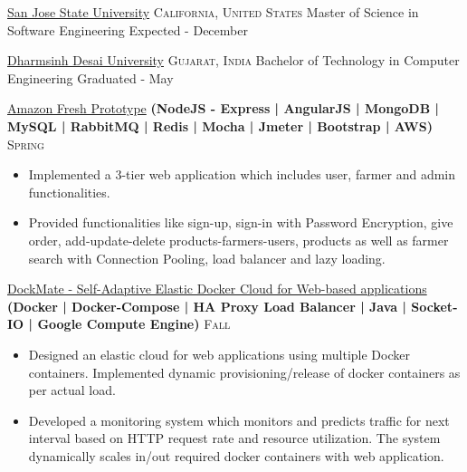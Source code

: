 \documentclass[10pt,a4paper]{article}
\begin{document}
{{\headedsection
  {\href{http://www.sjsu.edu/}{San Jose State University} }
  {\textsc{California, United States}} {%
  \headedsubsection
    {Master of Science in Software Engineering}
    {Expected - December }
    {}
}


\headedsection
  {\href{http://ddu.ac.in}{Dharmsinh Desai University} }
  {\textsc{Gujarat, India}} {%
  \headedsubsection
    {Bachelor of Technology in Computer Engineering}
    {Graduated - May }
    {}
}

\spacedhrule{0.0em}{-0.4em}




\headedsection  %
  {\href{https://github.com/darshilsaraiya/Amazon}{Amazon Fresh Prototype}
  \textbf{
  \small{(NodeJS - Express | AngularJS | MongoDB | MySQL | RabbitMQ | Redis | Mocha | Jmeter | Bootstrap | AWS)}}}
  {\textsc{Spring }} {%
  
    {\bodytext
    {
    \begin{itemize}
        \item Implemented a 3-tier web application which includes user, farmer and admin functionalities.
        \item Provided functionalities like sign-up, sign-in with Password Encryption, give order, add-update-delete products-farmers-users, products as well as farmer search with Connection Pooling, load balancer and lazy loading.
    \end{itemize}}}
}

\headedsection  %
  {\href{https://github.com/darshilsaraiya/dockmate}{DockMate - Self-Adaptive Elastic Docker Cloud for Web-based applications}
  \textbf{
  \small{(Docker | Docker-Compose | HA Proxy Load Balancer | Java | Socket-IO | Google Compute Engine)}}}
  {\textsc{Fall }} {%
  
    {\bodytext
    {
    \begin{itemize}
        \item Designed an elastic cloud for web applications using multiple Docker containers. Implemented dynamic provisioning/release of docker containers as per actual load.
        \item Developed a monitoring system which monitors and predicts traffic for next interval based on HTTP request rate and resource utilization. The system dynamically scales in/out required docker containers with web application.
    \end{itemize}}}
}


}}
\end{document}
